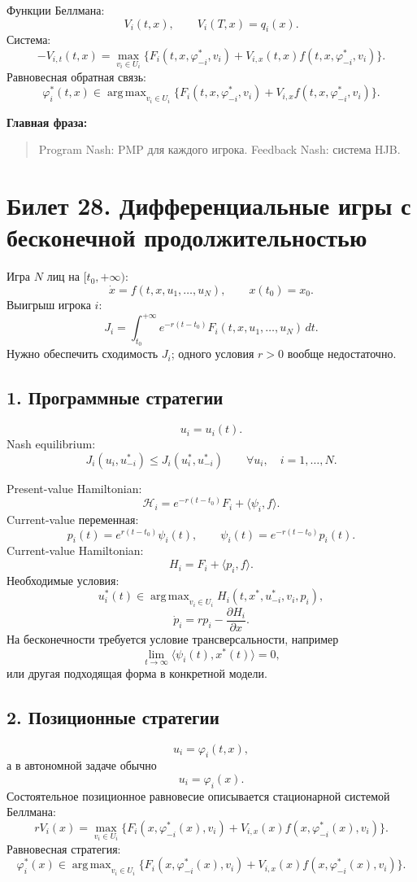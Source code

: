 \documentclass[12pt,a4paper]{article}
\DeclareMathOperator*{\argmax}{arg\,max}
\begin{document}
Функции Беллмана:
\[
 V_i(t,x),\qquad V_i(T,x)=q_i(x).
\]
Система:
\[
 -V_{i,t}(t,x)=\max_{v_i\in U_i}\{F_i(t,x,\varphi_{-i}^*,v_i)+V_{i,x}(t,x)f(t,x,\varphi_{-i}^*,v_i)\}.
\]
Равновесная обратная связь:
\[
 \varphi_i^*(t,x)\in\argmax_{v_i\in U_i}\{F_i(t,x,\varphi_{-i}^*,v_i)+V_{i,x}f(t,x,\varphi_{-i}^*,v_i)\}.
\]

\textbf{Главная фраза:}
\begin{quote}
Program Nash: PMP для каждого игрока. Feedback Nash: система HJB.
\end{quote}

\newpage
\section{Билет 28. Дифференциальные игры с бесконечной продолжительностью}

Игра $N$ лиц на $[t_0,+\infty)$:
\[
 \dot x=f(t,x,u_1,\ldots,u_N),\qquad x(t_0)=x_0.
\]
Выигрыш игрока $i$:
\[
 J_i=\int_{t_0}^{+\infty}e^{-r(t-t_0)}F_i(t,x,u_1,\ldots,u_N)\,dt.
\]
Нужно обеспечить сходимость $J_i$; одного условия $r>0$ вообще недостаточно.

\subsection*{1. Программные стратегии}

\[
 u_i=u_i(t).
\]
Nash equilibrium:
\[
 J_i(u_i,u_{-i}^*)\le J_i(u_i^*,u_{-i}^*)\qquad \forall u_i,\quad i=1,\ldots,N.
\]

Present-value Hamiltonian:
\[
 \mathcal H_i=e^{-r(t-t_0)}F_i+\langle\psi_i,f\rangle.
\]
Current-value переменная:
\[
 p_i(t)=e^{r(t-t_0)}\psi_i(t),\qquad \psi_i(t)=e^{-r(t-t_0)}p_i(t).
\]
Current-value Hamiltonian:
\[
 H_i=F_i+\langle p_i,f\rangle.
\]
Необходимые условия:
\[
 u_i^*(t)\in\argmax_{v_i\in U_i}H_i(t,x^*,u_{-i}^*,v_i,p_i),
\]
\[
 \dot p_i=rp_i-\frac{\partial H_i}{\partial x}.
\]
На бесконечности требуется условие трансверсальности, например
\[
 \lim_{t\to\infty}\langle\psi_i(t),x^*(t)\rangle=0,
\]
или другая подходящая форма в конкретной модели.

\subsection*{2. Позиционные стратегии}

\[
 u_i=\varphi_i(t,x),
\]
а в автономной задаче обычно
\[
 u_i=\varphi_i(x).
\]
Состоятельное позиционное равновесие описывается стационарной системой Беллмана:
\[
 rV_i(x)=\max_{v_i\in U_i}\{F_i(x,\varphi_{-i}^*(x),v_i)+V_{i,x}(x)f(x,\varphi_{-i}^*(x),v_i)\}.
\]
Равновесная стратегия:
\[
 \varphi_i^*(x)\in\argmax_{v_i\in U_i}\{F_i(x,\varphi_{-i}^*(x),v_i)+V_{i,x}(x)f(x,\varphi_{-i}^*(x),v_i)\}.
\]
\end{document}
